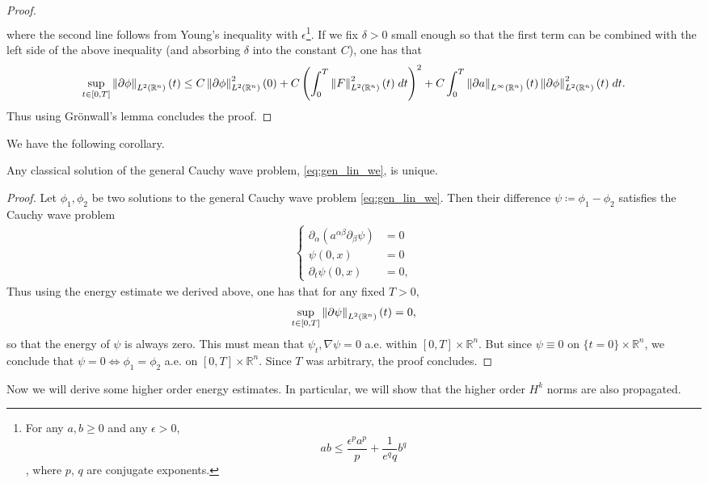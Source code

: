 \documentclass{article}
\numberwithin{equation}{section}
\begin{document}
\begin{proof}
\begin{align*}
		\end{align*}
		where the second line follows from Young's inequality with $\epsilon$\footnote{For any $a, b \geq 0$ and any $\epsilon > 0$, $$ab \leq \frac{\epsilon^{p}a^{p}}{p} + \frac{1}{e^{q}q}b^{q}$$, where $p$, $q$ are conjugate exponents.}. If we fix $\delta > 0$ small enough so that the first term can be combined with the left side of the above inequality (and absorbing $\delta$ into the constant $C$), one has that 
		\begin{align*}
			\begin{split}
				\sup_{t \in [0,T]}\left\Vert \partial \phi \right\Vert_{L^{2}(\mathbb{R}^{n})}(t) \leq C\left\Vert \partial \phi \right\Vert_{L^{2}(\mathbb{R}^{n})}^{2}(0) + C\left(\int_{0}^{T}\left\Vert F \right\Vert_{L^{2}(\mathbb{R}^{n})}^{2}(t)\;dt\right)^{2} + C\int_{0}^{T}\left\Vert \partial a \right\Vert_{L^{\infty}(\mathbb{R}^{n})}(t)\left\Vert \partial \phi \right\Vert^{2}_{L^{2}(\mathbb{R}^{n})}(t)\;dt.
			\end{split}
		\end{align*}
		Thus using Gr\"onwall's lemma concludes the proof. 
	\end{proof}
	We have the following corollary. 
	\begin{corollary}
		Any classical solution of the general Cauchy wave problem, \ref{eq:gen_lin_we}, is unique. 
	\end{corollary}
	\begin{proof}
		Let $\phi_{1}, \phi_{2}$ be two solutions to the general Cauchy wave problem \ref{eq:gen_lin_we}. Then their difference $\psi \coloneqq \phi_{1} - \phi_{2}$ satisfies the Cauchy wave problem 
		\begin{align*}
			\left\{
			\begin{aligned}
				\partial_{\alpha}(a^{\alpha\beta}\partial_{\beta}\psi) &= 0 \\
				\psi(0,x) &= 0 \\
				\partial_{t}\psi(0,x) &= 0,
			\end{aligned}
			\right.
			\label{eq:gen_lin_we}
		\end{align*}
		Thus using the energy estimate we derived above, one has that for any fixed $T > 0$, 
		\begin{align*}
			\begin{split}
				\sup_{t \in [0,T]}\left\Vert \partial \psi \right\Vert_{L^{2}(\mathbb{R}^{n})}(t) = 0, 
			\end{split}
		\end{align*}
		so that the energy of $\psi$ is always zero. This must mean that $\psi_{t}, \nabla \psi = 0$ a.e. within $[0,T] \times \mathbb{R}^{n}$. But since $\psi \equiv 0$ on $\{t = 0\} \times \mathbb{R}^{n}$, we conclude that $\psi =0 \iff \phi_{1} = \phi_{2}$ a.e. on $[0,T] \times \mathbb{R}^{n}$. Since $T$ was arbitrary, the proof concludes. 
	\end{proof}
	Now we will derive some higher order energy estimates. In particular, we will show that the higher order $H^{k}$ norms are also propagated. 
	
\end{document}
